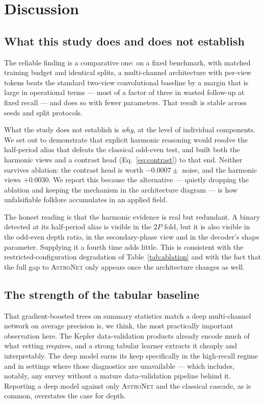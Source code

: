 \documentclass[preprint,12pt,authoryear]{elsarticle}
\newcommand{\astronet}{\textsc{AstroNet}}
\begin{document}
\section{Discussion}
\label{sec:discussion}

\subsection{What this study does and does not establish}

The reliable finding is a comparative one: on a fixed benchmark, with matched
training budget and identical splits, a multi-channel architecture with per-view
tokens beats the standard two-view convolutional baseline by a margin that is
large in operational terms --- most of a factor of three in wasted follow-up at
fixed recall --- and does so with fewer parameters. That result is stable across
seeds and split protocols.

What the study does not establish is \emph{why}, at the level of individual
components. We set out to demonstrate that explicit harmonic reasoning would
resolve the half-period alias that defeats the classical odd-even test, and
built both the harmonic views and a contrast head (Eq.~\ref{eq:contrast}) to
that end. Neither survives ablation: the contrast head is worth
$-0.0007 \pm$ noise, and the harmonic views $+0.0030$. We report this because the
alternative --- quietly dropping the ablation and keeping the mechanism in the
architecture diagram --- is how unfalsifiable folklore accumulates in an applied
field.

The honest reading is that the harmonic evidence is real but redundant. A binary
detected at its half-period alias is visible in the $2P$ fold, but it is also
visible in the odd-even depth ratio, in the secondary-phase view and in the
decoder's shape parameter. Supplying it a fourth time adds little. This is
consistent with the restricted-configuration degradation of
Table~\ref{tab:ablation} and with the fact that the full gap to \astronet{}
only appears once the architecture changes as well.

\subsection{The strength of the tabular baseline}

That gradient-boosted trees on summary statistics match a deep multi-channel
network on average precision is, we think, the most practically important
observation here. The Kepler data-validation products already encode much of
what vetting requires, and a strong tabular learner extracts it cheaply and
interpretably. The deep model earns its keep specifically in the high-recall
regime and in settings where those diagnostics are unavailable --- which
includes, notably, any survey without a mature data-validation pipeline behind
it. Reporting a deep model against only \astronet{} and the classical cascade,
as is common, overstates the case for depth.
\end{document}
